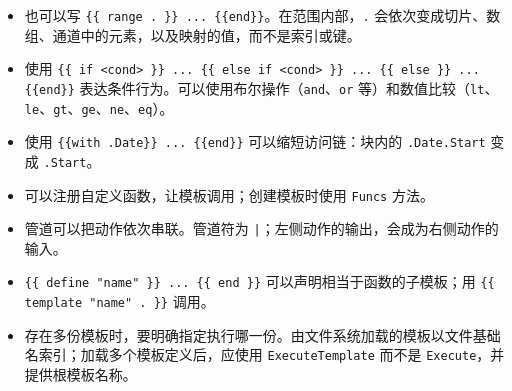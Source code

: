 \begin{itemize}
  \item 也可以写 \texttt{\{\{ range . \}\} ... \{\{end\}\}}。在范围内部，\texttt{.} 会依次变成切片、数组、通道中的元素，以及映射的值，而不是索引或键。
  \item 使用 \texttt{\{\{ if <cond> \}\} ... \{\{ else if <cond> \}\} ... \{\{ else \}\} ... \{\{end\}\}} 表达条件行为。可以使用布尔操作（\texttt{and}、\texttt{or} 等）和数值比较（\texttt{lt}、\texttt{le}、\texttt{gt}、\texttt{ge}、\texttt{ne}、\texttt{eq}）。
  \item 使用 \texttt{\{\{with .Date\}\} ... \{\{end\}\}} 可以缩短访问链：块内的 \texttt{.Date.Start} 变成 \texttt{.Start}。
  \item 可以注册自定义函数，让模板调用；创建模板时使用 \texttt{Funcs} 方法。
  \item 管道可以把动作依次串联。管道符为 \texttt{|}；左侧动作的输出，会成为右侧动作的输入。
  \item \texttt{\{\{ define "name" \}\} ... \{\{ end \}\}} 可以声明相当于函数的子模板；用 \texttt{\{\{ template "name" . \}\}} 调用。
  \item 存在多份模板时，要明确指定执行哪一份。由文件系统加载的模板以文件基础名索引；加载多个模板定义后，应使用 \texttt{ExecuteTemplate} 而不是 \texttt{Execute}，并提供根模板名称。
\end{itemize}
